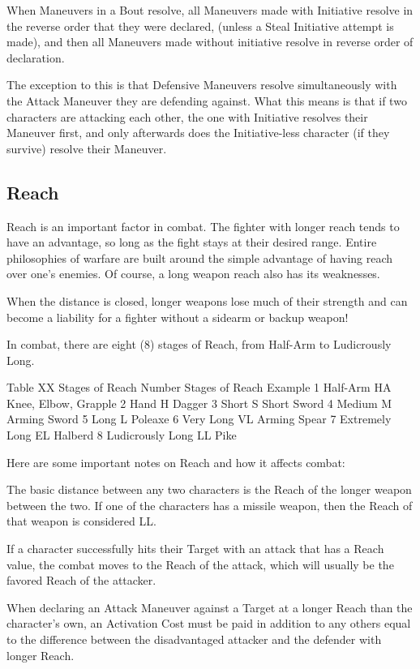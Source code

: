 \documentclass[oneside,11pt,english]{book}
\begin{document}
When Maneuvers in a Bout resolve, all Maneuvers made with Initiative resolve in the reverse
order that they were declared, (unless a Steal Initiative attempt is made), and then all Maneuvers
made without initiative resolve in reverse order of declaration.

The exception to this is that Defensive Maneuvers resolve simultaneously with the Attack
Maneuver they are defending against. What this means is that if two characters are attacking each
other, the one with Initiative resolves their Maneuver first, and only afterwards does the
Initiative-less character (if they survive) resolve their Maneuver.

\subsection{Reach}\label{sec:Reach} %
Reach is an important factor in combat. The fighter with longer reach tends to have an advantage, so long as the fight stays at their desired range. Entire philosophies of warfare are built around the simple advantage of having reach over one’s enemies. Of course, a long weapon reach also has its weaknesses.

When the distance is closed, longer weapons lose much of their strength and can become a liability for a fighter without a sidearm or backup weapon!

In combat, there are eight (8) stages of Reach, from Half-Arm to Ludicrously Long.

Table XX Stages of Reach
Number
Stages of Reach
Example
1
Half-Arm
HA
Knee, Elbow, Grapple
2
Hand
H
Dagger
3
Short
S
Short Sword
4
Medium
M
Arming Sword
5
Long
L
Poleaxe
6
Very Long
VL
Arming Spear
7
Extremely Long
EL
Halberd
8
Ludicrously Long
LL
Pike

Here are some important notes on Reach and how it affects combat:

The basic distance between any two characters is the Reach of the longer weapon between the two. If one of the characters has a missile weapon, then the Reach of that weapon is considered LL.

If a character successfully hits their Target with an attack that has a Reach value, the combat moves to the Reach of the attack, which will usually be the favored Reach of the attacker.

When declaring an Attack Maneuver against a Target at a longer Reach than the character’s own, an Activation Cost must be paid in addition to any others equal to the difference between the disadvantaged attacker and the defender with longer Reach.
\end{document}
